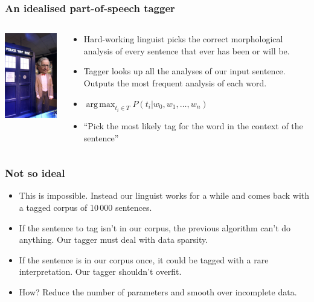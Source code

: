 \documentclass{beamer}
\DeclareMathOperator*{\argmax}{arg\,max}
\begin{document}
\begin{frame}
\frametitle{An idealised part-of-speech tagger}
\begin{columns}
  \begin{column}{4cm}
    \includegraphics[width=4cm]{time-travelling-linguist.png}
  \end{column}
  \begin{column}{8cm}
    \begin{itemize}

      \item Hard-working linguist picks the correct morphological analysis of
        every sentence that ever has been or will be.

      \item Tagger looks up all the analyses of our input sentence. Outputs the
        most frequent analysis of each word.

      \item $\argmax_{t_i\in{}T}{P(t_i|w_0,w_1,\ldots,w_n)}$

      \item ``Pick the most likely tag for the word in the context of the
        sentence''

    \end{itemize}
  \end{column}
\end{columns}
\end{frame}

\begin{frame}
\frametitle{Not so ideal}
\begin{itemize}

  \item This is impossible. Instead our linguist works for a while and comes
    back with a tagged corpus of 10\,000 sentences.

  \item If the sentence to tag isn't in our corpus, the previous algorithm
    can't do anything. Our tagger must deal with data sparsity.

  \item If the sentence is in our corpus once, it could be tagged with a rare
    interpretation. Our tagger shouldn't overfit.

  \item How? Reduce the number of parameters and smooth over incomplete data.

\end{itemize}
\end{frame}
\end{document}
